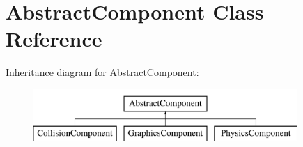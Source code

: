 \hypertarget{classAbstractComponent}{\section{Abstract\-Component Class Reference}
\label{classAbstractComponent}
}
Inheritance diagram for Abstract\-Component\-:\begin{figure}[H]
\begin{center}
\leavevmode
\includegraphics[height=2.000000cm]{classAbstractComponent}
\end{center}
\end{figure}

